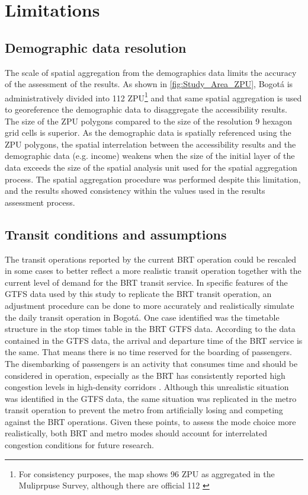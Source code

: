 \documentclass[12pt, a4paper]{report}
\begin{document}
\section{Limitations}

\subsection{Demographic data resolution}

The scale of spatial aggregation from the demographics data limits the accuracy of the assessment of the results. As shown in \ref{fig:Study_Area_ZPU}, Bogotá is administratively divided into 112 ZPU\footnote{For consistency purposes, the map shows 96 ZPU as aggregated in the Muliprpuse Survey, although there are official 112 \citep{secretariadistritaldegobiernoCaracterizacionUsuarios20212021}} and that same spatial aggregation is used to georeference the demographic data to disaggregate the accessibility results. The size of the ZPU polygons compared to the size of the resolution 9 hexagon grid cells is superior. As the demographic data is spatially referenced using the ZPU polygons, the spatial interrelation between the accessibility results and the demographic data (e.g. income) weakens when the size of the initial layer of the data exceeds the size of the spatial analysis unit used for the spatial aggregation process. The spatial aggregation procedure was performed despite this limitation, and the results showed consistency within the values used in the results assessment process.

\subsection{Transit conditions and assumptions}

The transit operations reported by the current BRT operation could be rescaled in some cases to better reflect a more realistic transit operation together with the current level of demand for the BRT transit service. In specific features of the GTFS data used by this study to replicate the BRT transit operation, an adjustment procedure can be done to more accurately and realistically simulate the daily transit operation in Bogotá. One case identified was the timetable structure in the stop times table in the BRT GTFS data. According to the data contained in the GTFS data, the arrival and departure time of the BRT service is the same. That means there is no time reserved for the boarding of passengers. The disembarking of passengers is an activity that consumes time and should be considered in operation, especially as the BRT has consistently reported high congestion levels in high-density corridors \citep{guzmanDensityorientedPublicTransport2021}. Although this unrealistic situation was identified in the GTFS data, the same situation was replicated in the metro transit operation to prevent the metro from artificially losing and competing against the BRT operations. Given these points, to assess the mode choice more realistically, both BRT and metro modes should account for interrelated congestion conditions for future research.
\end{document}
